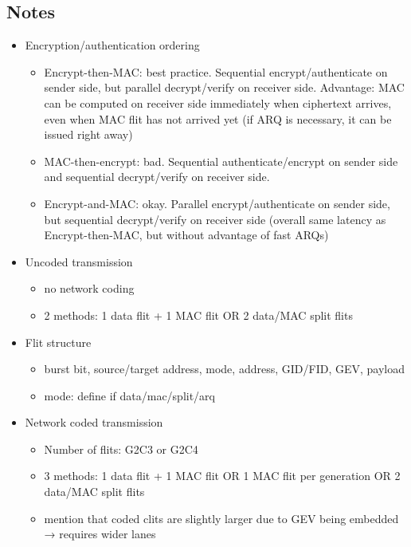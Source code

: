 \begin{itemize}
\iffalse
\section{Notes}
\begin{itemize}
    \item Encryption/authentication ordering
        \begin{itemize}
            \item Encrypt-then-MAC: best practice. Sequential encrypt/authenticate on sender side, but parallel decrypt/verify
                on receiver side. Advantage: MAC can be computed on receiver side immediately when ciphertext arrives, even when
                MAC flit has not arrived yet (if ARQ is necessary, it can be issued right away)
            \item MAC-then-encrypt: bad. Sequential authenticate/encrypt on sender side and sequential decrypt/verify on receiver
                side.
            \item Encrypt-and-MAC: okay. Parallel encrypt/authenticate on sender side, but sequential decrypt/verify on receiver
                side (overall same latency as Encrypt-then-MAC, but without advantage of fast ARQs)
        \end{itemize}
    \item Uncoded transmission
        \begin{itemize}
            \item no network coding
            \item 2 methods: 1 data flit + 1 MAC flit OR 2 data/MAC split flits
        \end{itemize}
    \item Flit structure
        \begin{itemize}
            \item burst bit, source/target address, mode, address, GID/FID, GEV, payload
            \item mode: define if data/mac/split/arq
        \end{itemize}
    \item Network coded transmission
        \begin{itemize}
            \item Number of flits: G2C3 or G2C4
            \item 3 methods: 1 data flit + 1 MAC flit OR 1 MAC flit per generation OR 2 data/MAC split flits
            \item mention that coded clits are slightly larger due to GEV being embedded → requires wider lanes

\end{itemize}
\end{itemize}
\end{itemize}
